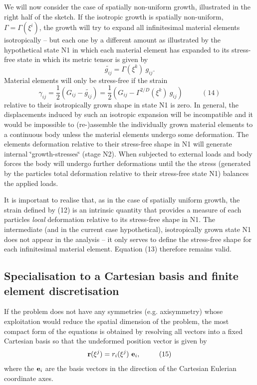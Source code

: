 We will now consider the case of spatially non-\/uniform growth, illustrated in the right half of the sketch. If the isotropic growth is spatially non-\/uniform, $ \Gamma = \Gamma(\xi^i)$, the growth will try to expand all infinitesimal material elements isotropically -- but each one by a different amount as illustrated by the hypothetical state N1 in which each material element has expanded to its stress-\/free state in which its metric tensor is given by \[ \widetilde{g_{ij}} = \Gamma(\xi^k) \ g_{ij}. \] Material elements will only be stress-\/free if the strain \[ \gamma_{ij} = \frac{1}{2} \left(G_{ij} - \widetilde{g_{ij}}\right) = \frac{1}{2} \left(G_{ij} - \Gamma^{2/D}(\xi^k) \ g_{ij} \right) \ \ \ \ \ \ \ \ \ \ \ \ (14) \] relative to their isotropically grown shape in state N1 is zero. In general, the displacements induced by such an isotropic expansion will be incompatible and it would be impossible to (re-\/)assemble the individually grown material elements to a continuous body unless the material elements undergo some deformation. The elements\textquotesingle{} deformation relative to their stress-\/free shape in N1 will generate internal \char`\"{}growth-\/stresses\char`\"{} (stage N2). When subjected to external loads and body forces the body will undergo further deformations until the the stress (generated by the particles\textquotesingle{} total deformation relative to their stress-\/free state N1) balances the applied loads.

It is important to realise that, as in the case of spatially uniform growth, the strain defined by (12) is an intrinsic quantity that provides a measure of each particles\textquotesingle{} {\itshape local} deformation relative to its stress-\/free shape in N1. The intermediate (and in the current case hypothetical), isotropically grown state N1 does not appear in the analysis -- it only serves to define the stress-\/free shape for each infinitesimal material element. Equation (13) therefore remains valid.



\hypertarget{index_CartesianLagrangian}{}\subsection{Specialisation to a Cartesian basis and finite element discretisation}\label{index_CartesianLagrangian}
If the problem does not have any symmetries (e.\+g. axisymmetry) whose exploitation would reduce the spatial dimension of the problem, the most compact form of the equations is obtained by resolving all vectors into a fixed Cartesian basis so that the undeformed position vector is given by \[ {\bf r}(\xi^j) = r_i(\xi^j) \ {\bf e}_i, \ \ \ \ \ \ \ \ (15) \] where the $ {\bf e}_i $ are the basis vectors in the direction of the Cartesian Eulerian coordinate axes.

